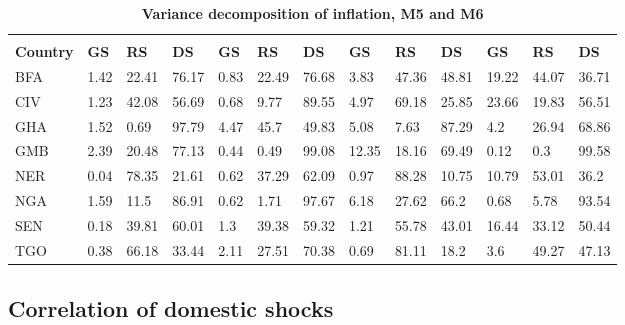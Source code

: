 \documentclass[]{article}
\begin{document}
\begin{table}[!h]

\caption{\label{tab:decomp-m5-m6}\bfseries{Variance decomposition of inflation, M5 and M6}}
\centering
\fontsize{9}{11}\selectfont
\begin{tabu} to 
\toprule
{} &  &  &  &  \\
\cmidrule(l{3pt}r{3pt}){2-4} \cmidrule(l{3pt}r{3pt}){5-7} \cmidrule(l{3pt}r{3pt}){8-10} \cmidrule(l{3pt}r{3pt}){11-13}
\textbf{Country} & \textbf{GS} & \textbf{RS} & \textbf{DS} & \textbf{GS} & \textbf{RS} & \textbf{DS} & \textbf{GS} & \textbf{RS} & \textbf{DS} & \textbf{GS} & \textbf{RS} & \textbf{DS}\\
\hline
BFA & 1.42 & 22.41 & 76.17 & 0.83 & 22.49 & 76.68 & 3.83 & 47.36 & 48.81 & 19.22 & 44.07 & 36.71\\
CIV & 1.23 & 42.08 & 56.69 & 0.68 & 9.77 & 89.55 & 4.97 & 69.18 & 25.85 & 23.66 & 19.83 & 56.51\\
GHA & 1.52 & 0.69 & 97.79 & 4.47 & 45.7 & 49.83 & 5.08 & 7.63 & 87.29 & 4.2 & 26.94 & 68.86\\
GMB & 2.39 & 20.48 & 77.13 & 0.44 & 0.49 & 99.08 & 12.35 & 18.16 & 69.49 & 0.12 & 0.3 & 99.58\\
NER & 0.04 & 78.35 & 21.61 & 0.62 & 37.29 & 62.09 & 0.97 & 88.28 & 10.75 & 10.79 & 53.01 & 36.2\\
NGA & 1.59 & 11.5 & 86.91 & 0.62 & 1.71 & 97.67 & 6.18 & 27.62 & 66.2 & 0.68 & 5.78 & 93.54\\
SEN & 0.18 & 39.81 & 60.01 & 1.3 & 39.38 & 59.32 & 1.21 & 55.78 & 43.01 & 16.44 & 33.12 & 50.44\\
TGO & 0.38 & 66.18 & 33.44 & 2.11 & 27.51 & 70.38 & 0.69 & 81.11 & 18.2 & 3.6 & 49.27 & 47.13\\
\bottomrule
\end{tabu}
\end{table}

\FloatBarrier

\hypertarget{correlation-of-domestic-shocks}{%
\subsection{Correlation of domestic shocks}\label{correlation-of-domestic-shocks}}
\end{document}
